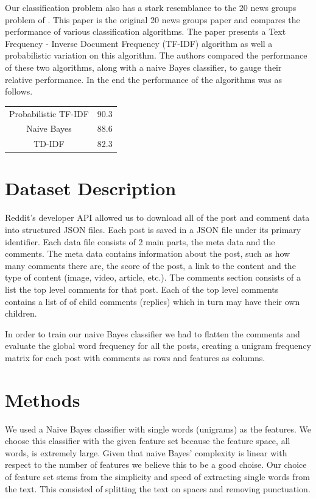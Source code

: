 \documentclass[10pt,twocolumn]{article}
\begin{document}
Our classification problem also has a stark resemblance to the 20 news groups problem of \cite{joachims1996probabilistic}. This paper is the original 20 news groups paper and compares the performance of various classification algorithms. The paper presents a Text Frequency - Inverse Document Frequency (TF-IDF) algorithm as well a probabilistic variation on this algorithm. The authors compared the performance of these two algorithms, along with a naive Bayes classifier, to gauge their relative performance. In the end the performance of the algorithms was as follows.
\\

\begin{center}
\begin{tabular}{|c|c|}
\hline
Probabilistic TF-IDF & 90.3 \\
Naive Bayes & 88.6 \\
TD-IDF & 82.3 \\
\hline
\end{tabular}
\end{center}

\section{Dataset Description}

Reddit's developer API allowed us to download all of the post and comment data into structured JSON files. Each post is saved in a JSON file under its primary identifier. Each data file consists of 2 main parts, the meta data and the comments. The meta data contains information about the post, such as how many comments there are, the score of the post, a link to the content and the type of content (image, video, article, etc.). The comments section consists of a list the top level comments for that post. Each of the top level comments contains a list of of child comments (replies) which in turn may have their own children. 

In order to train our naive Bayes classifier we had to flatten the comments and evaluate the global word frequency for all the posts, creating a unigram frequency matrix for each post with comments as rows and features as columns.

\section{Methods}

We used a Naive Bayes classifier with single words (unigrams) as the features. We choose this classifier with the given feature set because the feature space, all words, is extremely large. Given that naive Bayes' complexity is linear with respect to the number of features we believe this to be a good choise. Our choice of feature set stems from the simplicity and speed of extracting single words from the text. This consisted of splitting the text on spaces and removing punctuation. 
\end{document}
